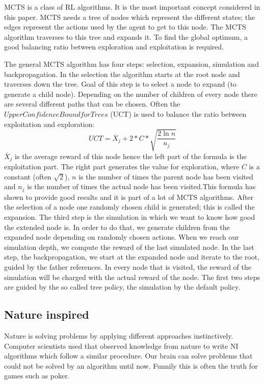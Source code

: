 \ac{MCTS} is a class of \ac{RL} algorithms. It is the most important concept considered in this paper. \ac{MCTS} needs a tree of nodes which represent the different states; the edges represent the actions used by the agent to get to this node. The \ac{MCTS} algorithm traverses to this tree and expands it. To find the global optimum, a good balancing ratio between exploration and exploitation is required. 

The general \ac{MCTS} algorithm has four steps: selection, expansion, simulation and backpropagation.
In the selection the algorithm starts at the root node and traverses down the tree. Goal of this step is to select a node to expand (to generate a child node). Depending on the number of children of every node there are several different paths that can be chosen. Often the $Upper Confidence Bound for Trees$ (UCT) is used to balance the ratio between exploitation and exploration:
\begin{equation}
	UCT = \overline{X}_j + 2 * C * \sqrt{\frac{2 \ln n}{n_j}}
\end{equation}
$\overline{X}_j$ is the average reward of this node hence the left part of the formula is the exploitation part. The right part generates the value for exploration, where $C$ is a constant (often $\sqrt{2}$), $n$ is the number of times the parent node has been visited and $n_j$ is the number of times the actual node has been visited.This formula has shown to provide good results and it is part of a lot of \ac{MCTS} algorithms.
After the selection of a node one randomly chosen child is generated; this is called the expansion.
The third step is the simulation in which we want to know how good the extended node is. In order to do that, we generate children from the expanded node depending on randomly chosen actions. When we reach our simulation depth, we compute the reward of the last simulated node.
In the last step, the backpropagation, we start at the expanded node and iterate to the root, guided by the father references. In every node that is visited, the reward of the simulation will be charged with the actual reward of the node.
The first two steps are guided by the so called tree policy, the simulation by the default policy.


\subsection{Nature inspired} 
Nature is solving problems by applying different approaches instinctively. Computer scientists used that observed knowledge from
nature to write \ac{NI} algorithms which follow a similar procedure. Our brain can solve problems that could not be solved by an algorithm until now. Funnily this is often the truth for games such as poker.

